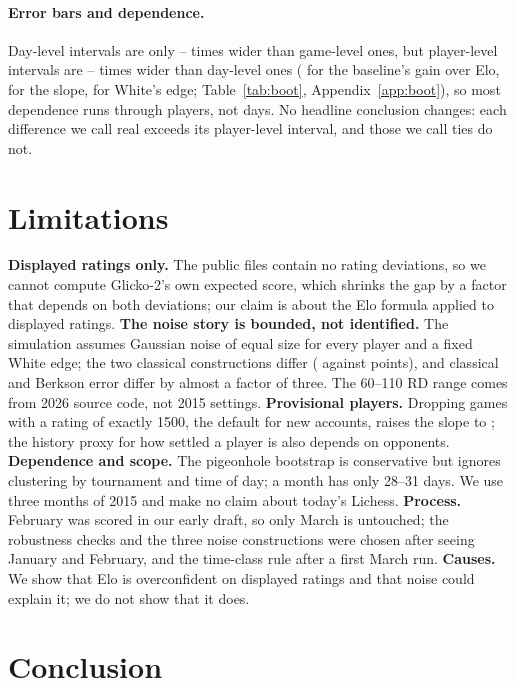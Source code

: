 \documentclass{article}
\begin{document}
\paragraph{Error bars and dependence.} Day-level intervals are only \dayOverGameMin--\dayOverGameMax{} times wider than game-level ones, but player-level intervals are \ratioMin--\ratioMax{} times wider than day-level ones (\ratioDelta{} for the baseline's gain over Elo, \ratioSlope{} for the slope, \ratioEdge{} for White's edge; Table~\ref{tab:boot}, Appendix~\ref{app:boot}), so most dependence runs through players, not days. No headline conclusion changes: each difference we call real exceeds its player-level interval, and those we call ties do not.

\section{Limitations}

\textbf{Displayed ratings only.} The public files contain no rating deviations, so we cannot compute Glicko-2's own expected score, which shrinks the gap by a factor that depends on both deviations; our claim is about the Elo formula applied to displayed ratings. \textbf{The noise story is bounded, not identified.} The simulation assumes Gaussian noise of equal size for every player and a fixed White edge; the two classical constructions differ (\sigmaClass{} against \sigmaPost{} points), and classical and Berkson error differ by almost a factor of three. The 60--110 RD range comes from 2026 source code, not 2015 settings. \textbf{Provisional players.} Dropping games with a rating of exactly 1500, the default for new accounts, raises the slope to \SlopeNoFifteen{}; the history proxy for how settled a player is also depends on opponents. \textbf{Dependence and scope.} The pigeonhole bootstrap is conservative but ignores clustering by tournament and time of day; a month has only 28--31 days. We use three months of 2015 and make no claim about today's Lichess. \textbf{Process.} February was scored in our early draft, so only March is untouched; the robustness checks and the three noise constructions were chosen after seeing January and February, and the time-class rule after a first March run. \textbf{Causes.} We show that Elo is overconfident on displayed ratings and that noise could explain it; we do not show that it does.

\section{Conclusion}
\end{document}
